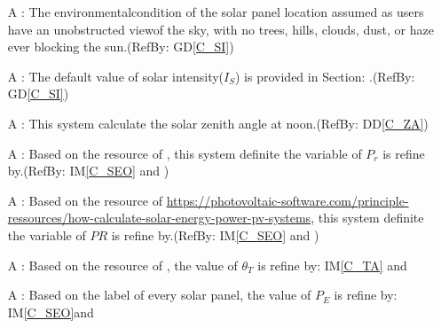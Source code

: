 \documentclass[12pt]{article}
\newcommand{\dref}[1]{GD\ref{#1}}
\newcommand{\ddref}[1]{DD\ref{#1}}
\newcounter{assumpnum} %
\newcommand{\iref}[1]{IM\ref{#1}}
\begin{document}
\begin{itemize}

\item[A\refstepcounter{assumpnum}\theassumpnum \label{a_spe}]: The
environmentalcondition of the solar panel location assumed as users have an
unobstructed viewof the sky, with no trees, hills, clouds, dust, or haze ever
blocking the
sun.(RefBy: \dref{C_SI})\\

\item[A\refstepcounter{assumpnum}\theassumpnum \label{a_dsip}]: The default
value of solar intensity($I_S$) is provided in Section:
.(RefBy: \dref{C_SI})\\

\item[A\refstepcounter{assumpnum}\theassumpnum \label{a_dsia}]: This system
calculate the solar zenith angle at noon.(RefBy: \ddref{C_ZA})\\

\item[A\refstepcounter{assumpnum}\theassumpnum \label{a_dp_r}]: Based
on the resource of \cite{EMPA2011}, this system definite the variable of $P_r$
is refine by.(RefBy: \iref{C_SEO} and )\\

\item[A\refstepcounter{assumpnum}\theassumpnum \label{a_dpr}]: Based
on the resource of
\url{https://photovoltaic-software.com/principle-ressources/how-calculate-solar-energy-power-pv-systems},
this system definite the variable of $PR$ is refine by.(RefBy: \iref{C_SEO} and
)\\

\item[A\refstepcounter{assumpnum}\theassumpnum \label{a_tilta}]: Based
on the resource of \cite{Charles2001}, the value of $\theta_{T}$ is refine by:
\iref{C_TA} and \\


\item[A\refstepcounter{assumpnum}\theassumpnum \label{a_panele}]: Based
on the label of every solar panel, the value of $P_E$ is refine by:
\iref{C_SEO}and \\



\end{itemize}
\end{document}
